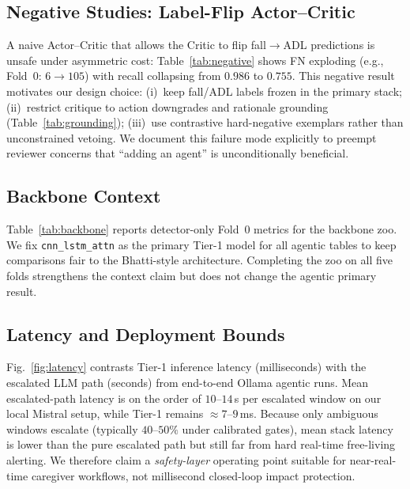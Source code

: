 \documentclass[journal]{IEEEtran}
\begin{document}



\subsection{Negative Studies: Label-Flip Actor--Critic}
\label{sec:negative}
A naive Actor--Critic that allows the Critic to flip fall$\rightarrow$ADL predictions is unsafe under asymmetric cost: Table~\ref{tab:negative} shows FN exploding (e.g., Fold~0: $6\rightarrow 105$) with recall collapsing from $0.986$ to $0.755$. This negative result motivates our design choice: (i)~keep fall/ADL labels frozen in the primary stack; (ii)~restrict critique to action downgrades and rationale grounding (Table~\ref{tab:grounding}); (iii)~use contrastive hard-negative exemplars rather than unconstrained vetoing. We document this failure mode explicitly to preempt reviewer concerns that ``adding an agent'' is unconditionally beneficial.



\subsection{Backbone Context}
Table~\ref{tab:backbone} reports detector-only Fold~0 metrics for the backbone zoo. We fix \texttt{cnn\_lstm\_attn} as the primary Tier-1 model for all agentic tables to keep comparisons fair to the Bhatti-style architecture. Completing the zoo on all five folds strengthens the context claim but does not change the agentic primary result.



\subsection{Latency and Deployment Bounds}
Fig.~\ref{fig:latency} contrasts Tier-1 inference latency (milliseconds) with the escalated LLM path (seconds) from end-to-end Ollama agentic runs. Mean escalated-path latency is on the order of $10$--$14$\,s per escalated window on our local Mistral setup, while Tier-1 remains $\approx 7$--$9$\,ms. Because only ambiguous windows escalate (typically $40$--$50\%$ under calibrated gates), mean stack latency is lower than the pure escalated path but still far from hard real-time free-living alerting. We therefore claim a \emph{safety-layer} operating point suitable for near-real-time caregiver workflows, not millisecond closed-loop impact protection.
\end{document}

